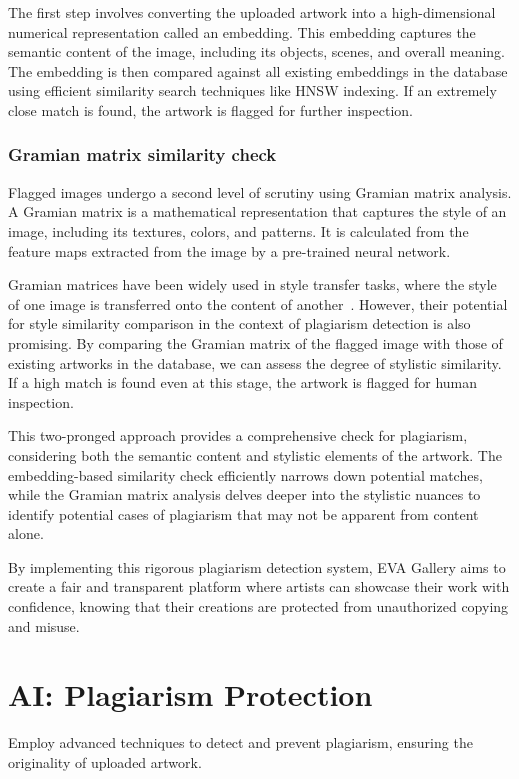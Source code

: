 The first step involves converting the uploaded artwork into a high-dimensional numerical representation called an embedding. This embedding captures the semantic content of the image, including its objects, scenes, and overall meaning. The embedding is then compared against all existing embeddings in the database using efficient similarity search techniques like HNSW indexing. If an extremely close match is found, the artwork is flagged for further inspection.

\subsubsection{Gramian matrix similarity check}

Flagged images undergo a second level of scrutiny using Gramian matrix analysis. A Gramian matrix is a mathematical representation that captures the style of an image, including its textures, colors, and patterns. It is calculated from the feature maps extracted from the image by a pre-trained neural network.

Gramian matrices have been widely used in style transfer tasks, where the style of one image is transferred onto the content of another~\cite{nicolas2019improving}. However, their potential for style similarity comparison in the context of plagiarism detection is also promising. By comparing the Gramian matrix of the flagged image with those of existing artworks in the database, we can assess the degree of stylistic similarity. If a high match is found even at this stage, the artwork is flagged for human inspection.

This two-pronged approach provides a comprehensive check for plagiarism, considering both the semantic content and stylistic elements of the artwork. The embedding-based similarity check efficiently narrows down potential matches, while the Gramian matrix analysis delves deeper into the stylistic nuances to identify potential cases of plagiarism that may not be apparent from content alone.

By implementing this rigorous plagiarism detection system, EVA Gallery aims to create a fair and transparent platform where artists can showcase their work with confidence, knowing that their creations are protected from unauthorized copying and misuse.

\newpage
\section{AI: Plagiarism Protection}
Employ advanced techniques to detect and prevent plagiarism, ensuring the originality of uploaded artwork.

